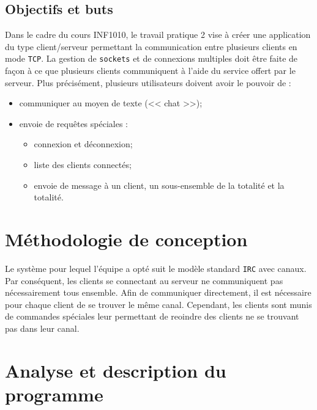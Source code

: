 \documentclass[12pt,french]{article}
\begin{document}
        \subsection{Objectifs et buts} %
        \label{sub:obj-buts}
            Dans le cadre du cours INF1010, le travail pratique 2 vise à créer une application du type
            client/serveur permettant la communication entre plusieurs clients en mode {\tt TCP}. La
            gestion de {\tt sockets} et de connexions multiples doit être faite de façon à ce que
            plusieurs clients communiquent à l'aide du service offert par le serveur. Plus précisément,
            plusieurs utilisateurs doivent avoir le pouvoir de :
            \begin{itemize}
                \item communiquer au moyen de texte (<< chat >>);
                \item envoie de requêtes spéciales :
                    \begin{itemize}
                        \item connexion et déconnexion;
                        \item liste des clients connectés;
                        \item envoie de message à un client, un sous-ensemble de la totalité et la
                            totalité.
                    \end{itemize}
            \end{itemize}

    \section{Méthodologie de conception} %
    \label{sec:method-concept}
        Le système pour lequel l'équipe a opté suit le modèle standard {\tt IRC} avec canaux. Par
        conséquent, les clients se connectant au serveur ne communiquent pas nécessairement tous
        ensemble. Afin de communiquer directement, il est nécessaire pour chaque client de se
        trouver le même canal. Cependant, les clients sont munis de commandes spéciales leur
        permettant de reoindre des clients ne se trouvant pas dans leur canal.



    \section{Analyse et description du programme} %
    \label{sec:analyse-desc}
\end{document}
